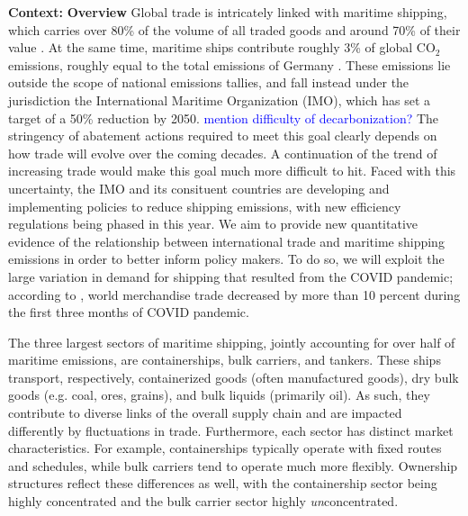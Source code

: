 \documentclass[hidelinks, 12pt,letterpaper]{article}
\begin{document}
\noindent \textbf{Context:}
\textbf{Overview}
Global trade is intricately linked with maritime shipping, which carries over 80\% of the volume of all traded goods and around 70\% of their value \citep{unctad2017review}.
At the same time, maritime ships contribute roughly 3\% of global CO$_2$ emissions, roughly equal to the total emissions of Germany \citep*{faber2020fourth}. These emissions lie outside the scope of national emissions tallies, and fall instead under the jurisdiction the International Maritime Organization (IMO), which has set a target of a 50\% reduction by 2050.
\textcolor{blue}{mention difficulty of decarbonization?}
The stringency of abatement actions required to meet this goal clearly depends on how trade will evolve over the coming decades. A continuation of the trend of increasing trade would make this goal much more difficult to hit. Faced with this uncertainty, the IMO and its consituent countries are developing and implementing policies to reduce shipping emissions, with new efficiency regulations being phased in this year. We aim to provide new quantitative evidence of the relationship between international trade and maritime shipping emissions in order to better inform policy makers. To do so, we will exploit the large variation in demand for shipping that resulted from the COVID pandemic; according to \cite{oecd21}, world merchandise trade decreased by more than 10 percent during the first three months of COVID pandemic.

The three largest sectors of maritime shipping, jointly accounting for over half of maritime emissions, are containerships, bulk carriers, and tankers. These ships transport, respectively,  containerized goods (often manufactured goods), dry bulk goods (e.g. coal, ores, grains), and bulk liquids (primarily oil). As such, they contribute to diverse links of the overall supply chain and are impacted differently by fluctuations in trade. Furthermore, each sector has distinct market characteristics. For example, containerships typically operate with fixed routes and schedules, while bulk carriers tend to operate much more flexibly. Ownership structures reflect these differences as well, with the containership sector being highly concentrated and the bulk carrier sector highly \textit{un}concentrated.
\end{document}
